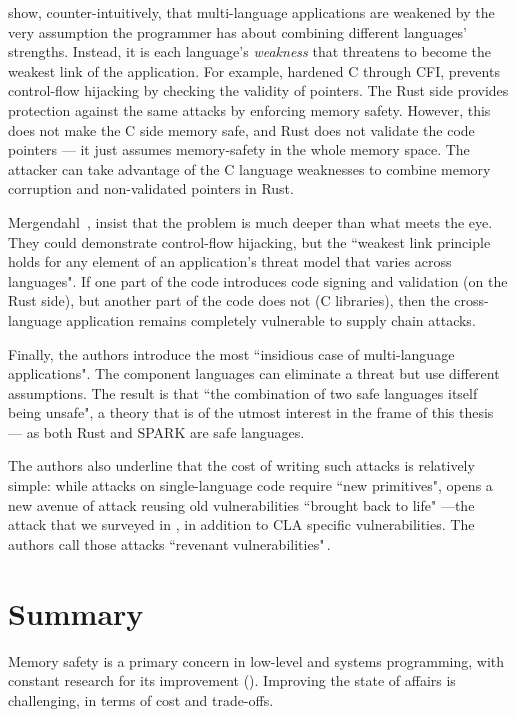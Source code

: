 \documentclass[nomenclature, english, bibtex]{kththesis}
\begin{document}
 show, counter-intuitively, that multi-language applications are weakened by the very assumption the programmer has about combining different languages' strengths. Instead, it is each language's \emph{weakness} that threatens to become the weakest link of the application.
For example, hardened C through \gls{CFI}, prevents control-flow hijacking by checking the validity of pointers. The Rust side provides protection against the same attacks by enforcing memory safety. However, this does not make the C side memory safe, and Rust does not validate the code pointers --- it just assumes \gls{memory-safety} in the whole memory space. The attacker can take advantage of the C language weaknesses to combine memory corruption and non-validated pointers in Rust. 

Mergendahl \etal\,\cite{mergendahl_cross-language_2022}, insist that the problem is much deeper than what meets the eye. They could demonstrate control-flow hijacking, but the ``weakest link principle holds for any element of an application’s threat model that varies across languages". If one part of the code introduces code signing and validation (on the Rust side), but another part of the code does not (C libraries), then the cross-language application remains completely vulnerable to supply chain attacks.

Finally, the authors introduce the most ``insidious case of multi-language applications". The component languages can eliminate a threat but use different assumptions. The result is that ``the combination of two safe languages itself being unsafe", a theory that is of the utmost interest in the frame of this thesis --- as both Rust and SPARK are safe languages.

The authors also underline that the cost of writing such attacks is relatively simple: while attacks on single-language code require ``new primitives",  opens a new avenue of attack reusing old vulnerabilities ``brought back to life" ---the attack that we surveyed in , in addition to CLA specific vulnerabilities. The authors call those attacks ``revenant vulnerabilities"\,\cite{mergendahl_cross-language_2022}. 

\section{Summary}

Memory safety is a primary concern in low-level and systems programming, with constant research for its improvement (). Improving the state of affairs is challenging, in terms of cost and trade-offs.
\end{document}
